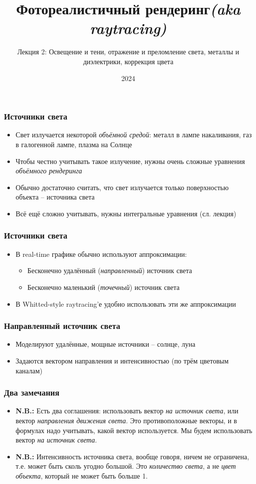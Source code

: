 \documentclass[10pt,handout]{beamer}
\title{Фотореалистичный рендеринг\quad\quad\quad\quad\quad\quad \textit{(aka raytracing)}}
\subtitle{Лекция 2: Освещение и тени, отражение и преломление света, металлы и диэлектрики, коррекция цвета}
\date{2024}
\begin{document}
\frame{\titlepage}

\begin{frame}
\frametitle{Источники света}
\begin{itemize}
\item Свет излучается некоторой \textit{объёмной средой}: металл в лампе накаливания, газ в галогенной лампе, плазма на Солнце
\pause
\item Чтобы честно учитывать такое излучение, нужны очень сложные уравнения \textit{объёмного рендеринга}
\pause
\item Обычно достаточно считать, что свет излучается только поверхностью объекта -- источника света
\pause
\item Всё ещё сложно учитывать, нужны интегральные уравнения (сл. лекция)
\end{itemize}
\end{frame}

\begin{frame}
\frametitle{Источники света}
\begin{itemize}
\item В real-time графике обычно используют аппроксимации:
\pause
\begin{itemize}
\item Бесконечно удалённый (\textit{направленный}) источник света
\pause
\item Бесконечно маленький (\textit{точечный}) источник света
\end{itemize}
\pause
\item В Whitted-style raytracing'е удобно использовать эти же аппроксимации
\end{itemize}
\end{frame}

\begin{frame}[fragile]
\frametitle{Направленный источник света}
\begin{itemize}
\item Моделируют удалённые, мощные источники -- солнце, луна
\pause
\item Задаются вектором направления и интенсивностью (по трём цветовым каналам)
\end{itemize}
\end{frame}

\begin{frame}[fragile]
\frametitle{Два замечания}
\begin{itemize}
\item \textbf{\alert{N.B.:}} Есть два соглашения: использовать вектор \textit{на источник света}, или вектор \textit{направления движения света}. Это противоположные векторы, и в формулах надо учитывать, какой вектор используется. Мы будем использовать вектор \textit{на источник света}.
\pause
\item \textbf{\alert{N.B.:}} Интенсивность источника света, вообще говоря, ничем не ограничена, т.е. может быть сколь угодно большой. Это \textit{количество света}, а не \textit{цвет объекта}, который не может быть больше 1.
\end{itemize}
\end{frame}
\end{document}
